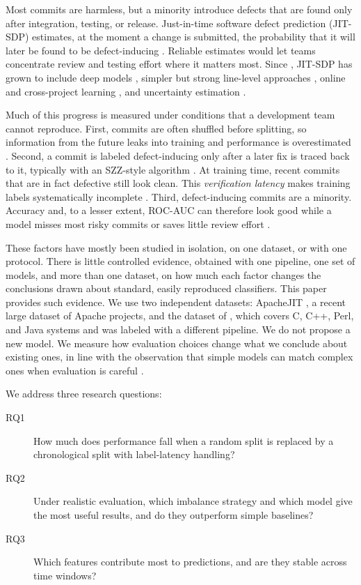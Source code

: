 Most commits are harmless, but a minority introduce defects that are found only after integration, testing, or release. Just-in-time software defect prediction (JIT-SDP) estimates, at the moment a change is submitted, the probability that it will later be found to be defect-inducing \citep{mockus2000,kamei2013}. Reliable estimates would let teams concentrate review and testing effort where it matters most. Since \citet{kamei2013}, JIT-SDP has grown to include deep models \citep{hoang2019,hoang2020}, simpler but strong line-level approaches \citep{pornprasit2021}, online and cross-project learning \citep{tabassum2022,cabral2022}, and uncertainty estimation \citep{shahini2024}.

Much of this progress is measured under conditions that a development team cannot reproduce. First, commits are often shuffled before splitting, so information from the future leaks into training and performance is overestimated \citep{tantithamthavorn2017,falessi2020,song2023a}. Second, a commit is labeled defect-inducing only after a later fix is traced back to it, typically with an SZZ-style algorithm \citep{sliwerski2005}. At training time, recent commits that are in fact defective still look clean. This \emph{verification latency} makes training labels systematically incomplete \citep{cabral2019}. Third, defect-inducing commits are a minority. Accuracy and, to a lesser extent, ROC-AUC can therefore look good while a model misses most risky commits or saves little review effort \citep{yang2016,saito2015}.

These factors have mostly been studied in isolation, on one dataset, or with one protocol. There is little controlled evidence, obtained with one pipeline, one set of models, and more than one dataset, on how much each factor changes the conclusions drawn about standard, easily reproduced classifiers. This paper provides such evidence. We use two independent datasets: ApacheJIT \citep{keshavarz2022}, a recent large dataset of Apache projects, and the dataset of \citet{kamei2013}, which covers C, C++, Perl, and Java systems and was labeled with a different pipeline. We do not propose a new model. We measure how evaluation choices change what we conclude about existing ones, in line with the observation that simple models can match complex ones when evaluation is careful \citep{zeng2021}.

We address three research questions:
\begin{description}
\item[RQ1] How much does performance fall when a random split is replaced by a chronological split with label-latency handling?
\item[RQ2] Under realistic evaluation, which imbalance strategy and which model give the most useful results, and do they outperform simple baselines?
\item[RQ3] Which features contribute most to predictions, and are they stable across time windows?
\end{description}

